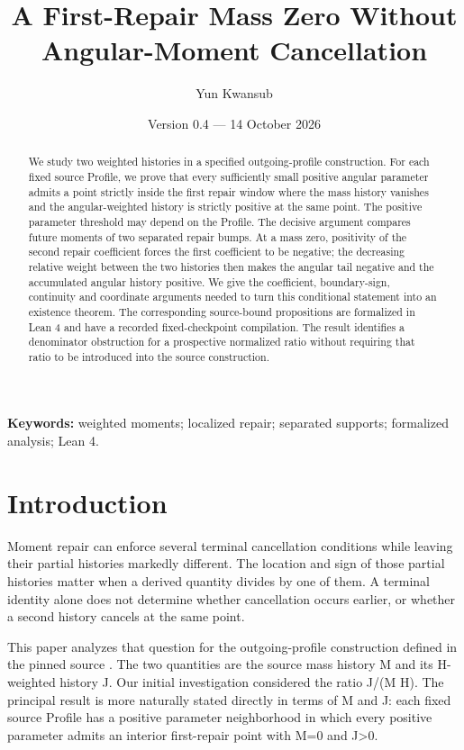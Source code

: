 \documentclass[11pt,a4paper]{article}
\author{Yun Kwansub}
\date{Version 0.4 --- 14 October 2026}
\title{A First-Repair Mass Zero Without Angular-Moment Cancellation}
\begin{document}
\maketitle
\begin{abstract}

We study two weighted histories in a specified outgoing-profile construction. For each fixed source Profile, we prove that every sufficiently small positive angular parameter admits a point strictly inside the first repair window where the mass history vanishes and the angular-weighted history is strictly positive at the same point. The positive parameter threshold may depend on the Profile. The decisive argument compares future moments of two separated repair bumps. At a mass zero, positivity of the second repair coefficient forces the first coefficient to be negative; the decreasing relative weight between the two histories then makes the angular tail negative and the accumulated angular history positive. We give the coefficient, boundary-sign, continuity and coordinate arguments needed to turn this conditional statement into an existence theorem. The corresponding source-bound propositions are formalized in Lean 4 and have a recorded fixed-checkpoint compilation. The result identifies a denominator obstruction for a prospective normalized ratio without requiring that ratio to be introduced into the source construction.

\end{abstract}
\noindent \textbf{Keywords:} weighted moments; localized repair; separated supports; formalized analysis; Lean 4.

\section{Introduction}

Moment repair can enforce several terminal cancellation conditions while leaving their partial histories markedly different. The location and sign of those partial histories matter when a derived quantity divides by one of them. A terminal identity alone does not determine whether cancellation occurs earlier, or whether a second history cancels at the same point.

This paper analyzes that question for the outgoing-profile construction defined in the pinned  source \cite{ref1}. The two quantities are the source mass history M and its H-weighted history J. Our initial investigation considered the ratio J/(M H). The principal result is more naturally stated directly in terms of M and J: each fixed source Profile has a positive parameter neighborhood in which every positive parameter admits an interior first-repair point with M=0 and J>0.
\end{document}
